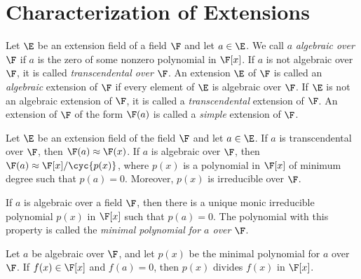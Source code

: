 \section{Characterization of Extensions}

\begin{definition}
	Let $\E$ be an extension field of a field $\F$ and let $a \in \E$. We call $a$ \textit{algebraic over $\F$} if $a$ is the zero of some nonzero polynomial in $\F[x]$. If $a$ is not algebraic over $\F$, it is called \textit{transcendental over $\F$}. An extension $\E$ of $\F$ is called an \textit{algebraic} extension of $\F$ if every element of $\E$ is algebraic over $\F$. If $\E$ is not an algebraic extension of $\F$, it is called a \textit{transcendental} extension of $\F$. An extension of $\F$ of the form $\F(a)$ is called a \textit{simple} extension of $\F$.
\end{definition}

\begin{theorem}
	Let $\E$ be an extension field of the field $\F$ and let $a \in \E$. If $a$ is transcendental over $\F$, then $\F(a) \approx \F(x)$. If $a$ is algebraic over $\F$, then $\F(a) \approx \F[x]/\cyc{p(x)}$, where $p(x)$ is a polynomial in $\F[x]$ of minimum degree such that $p(a) = 0$. Moreover, $p(x)$ is irreducible over $\F$.
\end{theorem}

\begin{theorem}
	If $a$ is algebraic over a field $\F$, then there is a unique monic irreducible polynomial $p(x)$ in $\F[x]$ such that $p(a)=0$. The polynomial with this property is called the \textit{minimal polynomial for $a$ over $\F$}.
\end{theorem}

\begin{theorem}
	Let $a$ be algebraic over $\F$, and let $p(x)$ be the minimal polynomial for $a$ over $\F$. If $f(x) \in \F[x]$ and $f(a) = 0$, then $p(x)$ divides $f(x)$ in $\F[x]$.
\end{theorem}
